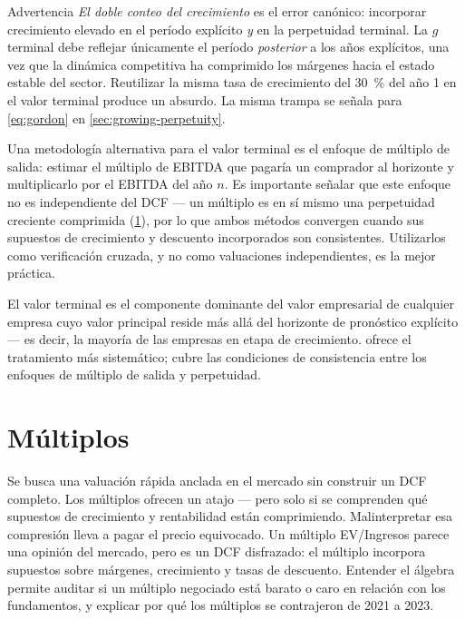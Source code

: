 \begin{admonition}{Advertencia}
\emph{El doble conteo del crecimiento} es el error canónico: incorporar crecimiento elevado en el período
explícito \emph{y} en la perpetuidad terminal. La \(g\) terminal debe reflejar únicamente el período
\emph{posterior} a los años explícitos, una vez que la dinámica competitiva ha comprimido los márgenes
hacia el estado estable del sector. Reutilizar la misma tasa de crecimiento del \qty{30}{\percent}
del año 1 en el valor terminal produce un absurdo. La misma trampa se señala para \cref{eq:gordon}
en \cref{sec:growing-perpetuity}.
\end{admonition}

Una metodología alternativa para el valor terminal es el enfoque de múltiplo de salida: estimar el
múltiplo de EBITDA que pagaría un comprador al horizonte y multiplicarlo por el EBITDA del año \(n\).
Es importante señalar que este enfoque no es independiente del DCF --- un múltiplo es en sí mismo una
perpetuidad creciente comprimida (\cref{sec:multiples}), por lo que ambos métodos convergen cuando sus
supuestos de crecimiento y descuento incorporados son consistentes. Utilizarlos como verificación
cruzada, y no como valuaciones independientes, es la mejor práctica.

El valor terminal es el componente dominante del valor empresarial de cualquier empresa cuyo valor
principal reside más allá del horizonte de pronóstico explícito --- es decir, la mayoría de las empresas
en etapa de crecimiento. \textcite{damodaran2012} ofrece el tratamiento más sistemático; \textcite{brealey2020}
cubre las condiciones de consistencia entre los enfoques de múltiplo de salida y perpetuidad.

\section{Múltiplos}\label{sec:multiples}

Se busca una valuación rápida anclada en el mercado sin construir un DCF completo. Los múltiplos ofrecen
un atajo --- pero solo si se comprenden qué supuestos de crecimiento y rentabilidad están comprimiendo.
Malinterpretar esa compresión lleva a pagar el precio equivocado. Un múltiplo EV/Ingresos parece una
opinión del mercado, pero es un DCF disfrazado: el múltiplo incorpora supuestos sobre márgenes, crecimiento
y tasas de descuento. Entender el álgebra permite auditar si un múltiplo negociado está barato o caro en
relación con los fundamentos, y explicar por qué los múltiplos se contrajeron de 2021 a 2023.

